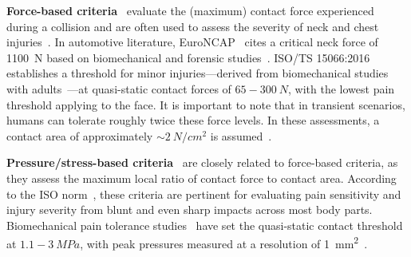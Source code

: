 \textbf{Force-based criteria}~\citep{kirschner2021experimental} evaluate the (maximum) contact force experienced during a collision and are often used to assess the severity of neck and chest injuries~\citep{haddadin2013towards}. In automotive literature, EuroNCAP~\citep{EuroNCAP2004} cites a critical neck force of \SI{1100}{N} based on biomechanical and forensic studies~\citep{madea2019handbuch, haddadin2009requirements}. ISO/TS 15066:2016~\citep{iso2016collaborative} establishes a threshold for minor injuries—derived from biomechanical studies with adults~\citep{muttray2014kollaborierende}—at quasi-static contact forces of $65-300~\si{N}$, with the lowest pain threshold applying to the face. It is important to note that in transient scenarios, humans can tolerate roughly twice these force levels. In these assessments, a contact area of approximately $\sim 2~\si{N \per cm^2}$ is assumed~\citep{iso2016collaborative}.

\textbf{Pressure/stress-based criteria}~\cite{wassink2007towards, haddadin2013towards} are closely related to force-based criteria, as they assess the maximum local ratio of contact force to contact area. According to the ISO norm~\citep{iso2016collaborative}, these criteria are pertinent for evaluating pain sensitivity and injury severity from blunt and even sharp impacts across most body parts. Biomechanical pain tolerance studies~\citep{muttray2014kollaborierende} have set the quasi-static contact threshold at $1.1-3~\si{MPa}$, with peak pressures measured at a resolution of \SI{1}{mm^2}~\citep{iso2016collaborative}.

